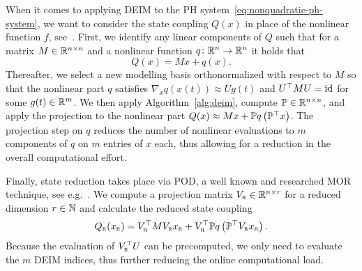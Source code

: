 When it comes to applying \ac{DEIM} to the \ac{PH} system~\eqref{eq:nonquadratic-ph-system}, we want to consider the state coupling $Q(x)$ in place of the nonlinear function $f$, see~\cite[Section~3]{Chaturantabut2016}.
First, we identify any linear components of $Q$ such that for a matrix $M \in \mathbb{R}^{n \times n}$ and a nonlinear function $q \colon \mathbb{R}^n \to \mathbb{R}^n$ it holds that
\begin{equation}\label{eq:deim-decomposition}
    Q(x) = M x + q(x).
\end{equation}
Thereafter, we select a new modelling basis orthonormalized with respect to $M$ so that the nonlinear part $q$ satisfies $\nabla_x q(x(t)) \approx U g(t)$ and $U^{\top} M U = \text{id}_{}$ for some $g(t) \in \mathbb{R}^m$.
We then apply Algorithm~\ref{alg:deim}, compute $\mathbb{P} \in \mathbb{R}^{n \times n}$, and apply the projection to the nonlinear part $Q(x) \approx M x + \mathbb{P} q\left( \mathbb{P}^{\top} x \right)$.
The projection step on $q$ reduces the number of nonlinear evaluations to $m$ components of $q$ on $m$ entries of $x$ each, thus allowing for a reduction in the overall computational effort.

Finally, state reduction takes place via \ac{POD}, a well known and researched \ac{MOR} technique, see e.g.~\cite{Pinnau2008}.
We compute a projection matrix $V_{\textnormal{\scshape r}} \in \mathbb{R}^{n \times r}$ for a reduced dimension $r \in \mathbb{N}$ and calculate the reduced state coupling
\begin{equation*}
    Q_{\textnormal{\scshape r}}(x_{\textnormal{\scshape r}}) = V_{\textnormal{\scshape r}}^{\top} M V_{\textnormal{\scshape r}} x_{\textnormal{\scshape r}} + V_{\textnormal{\scshape r}}^{\top}  \mathbb{P} q\left( \mathbb{P}^{\top} V_{\textnormal{\scshape r}} x_{\textnormal{\scshape r}} \right).
\end{equation*}
Because the evaluation of $V_{\textnormal{\scshape r}}^{\top} U$ can be precomputed, we only need to evaluate the $m$ \ac{DEIM} indices, thus further reducing the online computational load.

